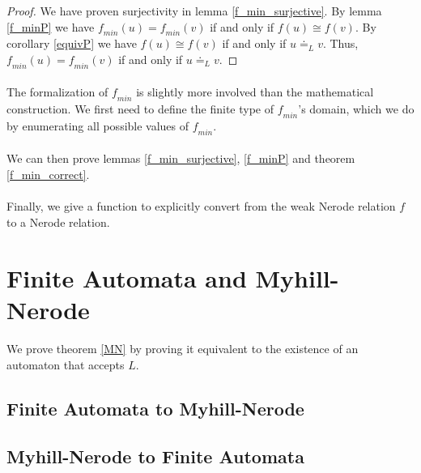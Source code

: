 \begin{proof}
    We have proven surjectivity in lemma \ref{f_min_surjective}. 
    By lemma \ref{f_minP} we have $\mathit{f_{min}}(u) = \mathit{f_{min}}(v)$ if and only if $f(u) \cong f(v)$.
    By corollary \ref{equivP} we have $f(u) \cong f(v)$ if and only if $u \doteq_L v$.
    Thus, $\mathit{f_{min}}(u) = \mathit{f_{min}}(v)$ if and only if $u \doteq_L v$.
\end{proof}

\paragraph{}
The formalization of $\mathit{f_{min}}$ is slightly more involved than the mathematical construction. 
We first need to define the finite type of $\mathit{f_{min}}$'s domain, 
which we do by enumerating all possible values of $\mathit{f_{min}}$.


\paragraph{}
We can then prove lemmas \ref{f_min_surjective}, \ref{f_minP} and theorem \ref{f_min_correct}.


\paragraph{}
Finally, we give a function to explicitly convert from the weak Nerode relation $f$ to a Nerode relation.


\section{Finite Automata and Myhill-Nerode}

\paragraph{}
We prove theorem \ref{MN} by proving it equivalent to the existence of an automaton that accepts $L$.



\subsection{Finite Automata to Myhill-Nerode}


\subsection{Myhill-Nerode to Finite Automata}

\paragraph{}



